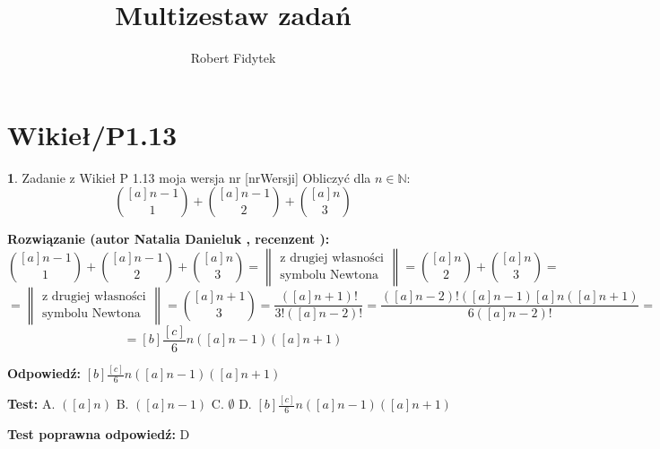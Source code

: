 \documentclass[12pt, a4paper]{article}
\title{Multizestaw zadań}
\author{Robert Fidytek}
\date{}
\theoremstyle{definition} %
\newtheorem{zad}{}
\newcommand{\kategoria}[1]{\section{#1}} %
\newcommand{\zadStart}[1]{\begin{zad}#1\newline} %
\newcommand{\zadStop}{\end{zad}}   %
\newcommand{\rozwStart}[2]{\noindent \textbf{Rozwiązanie (autor #1 , recenzent #2): }\newline} %
\newcommand{\rozwStop}{\newline}                                            %
\newcommand{\odpStart}{\noindent \textbf{Odpowiedź:}\newline}    %
\newcommand{\odpStop}{\newline}                                             %
\newcommand{\testStart}{\noindent \textbf{Test:}\newline} %
\newcommand{\testStop}{\newline} %
\newcommand{\kluczStart}{\noindent \textbf{Test poprawna odpowiedź:}\newline} %
\newcommand{\kluczStop}{\newline} %
\begin{document}
\maketitle

\kategoria{Wikieł/P1.13}

\zadStart{Zadanie z Wikieł P 1.13 moja wersja nr [nrWersji]}
Obliczyć dla $n \in \mathbb{N}$:\\
$$\binom{[a]n - 1}{1} + \binom{[a]n - 1}{2} + \binom{[a]n}{3}$$
\zadStop

\rozwStart{Natalia Danieluk}{}
$$\binom{[a]n - 1}{1} + \binom{[a]n - 1}{2} + \binom{[a]n}{3} = 
\left \rVert 
\begin{split} 
\text{z drugiej własności} \\
\text{symbolu Newtona}
\end{split} \right \rVert 
= \binom{[a]n}{2} + \binom{[a]n}{3} = $$
$$= \left \rVert 
\begin{split} 
\text{z drugiej własności} \\
\text{symbolu Newtona}
\end{split} \right \rVert 
= \binom{[a]n + 1}{3} = \frac{([a]n + 1)!}{3!([a]n - 2)!} = 
\frac{([a]n - 2)!([a]n - 1)[a]n([a]n + 1)}{6([a]n - 2)!} = $$
$$= [b]\frac{[c]}{6}n([a]n - 1)([a]n + 1)$$
\rozwStop

\odpStart
$[b]\frac{[c]}{6}n([a]n - 1)([a]n + 1)$
\odpStop

\testStart
A. $([a]n)$
B. $([a]n - 1)$
C. $\emptyset$
D. $[b]\frac{[c]}{6}n([a]n - 1)([a]n + 1)$
\testStop

\kluczStart
D
\kluczStop
\end{document}
